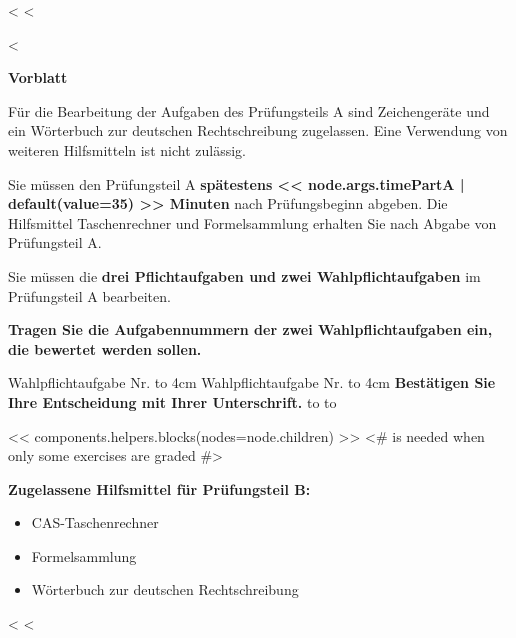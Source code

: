 \documentclass[lang=ngerman]{edoxarticle}
\begin{document}
<%
<%
\begin{exam}<%

\vskip20pt
{\LARGE\textbf{Vorblatt}}
\vskip20pt

Für die Bearbeitung der Aufgaben des Prüfungsteils A sind Zeichengeräte und ein
Wörterbuch zur deutschen Rechtschreibung zugelassen. Eine Verwendung von
weiteren Hilfsmitteln ist nicht zulässig.

Sie müssen den Prüfungsteil A \textbf{spätestens << node.args.timePartA | default(value=35) >> Minuten} nach Prüfungsbeginn
abgeben. Die Hilfsmittel Taschenrechner und Formelsammlung erhalten Sie nach
Abgabe von Prüfungsteil A.

Sie müssen die \textbf{drei Pflichtaufgaben und zwei Wahlpflichtaufgaben} im
Prüfungsteil A bearbeiten.

\textbf{Tragen Sie die Aufgabennummern der zwei Wahlpflichtaufgaben ein, die
bewertet werden sollen.}

\vskip20pt
Wahlpflichtaufgabe Nr. \hbox to 4cm{\hrulefill}
\vskip10pt
Wahlpflichtaufgabe Nr. \hbox to 4cm{\hrulefill}
\vskip30pt
\textbf{Bestätigen Sie Ihre Entscheidung mit Ihrer Unterschrift.}
\vskip10pt
\hbox to \textwidth{Name, Vorname des Prüflings: \kern3.4cm\leaders\hrule\hfill}\vskip10pt
\hbox to \textwidth{Unterschrift des Prüflings:  \kern4cm\leaders\hrule\hfill}

\newpage

<< components.helpers.blocks(nodes=node.children) >>
<# \setpoints is needed when only some exercises are graded #>

\vskip20pt
\textbf{Zugelassene Hilfsmittel für Prüfungsteil B:}
\begin{itemize}
\item CAS-Taschenrechner 
\item Formelsammlung
\item Wörterbuch zur deutschen Rechtschreibung
\end{itemize}


<%
<%
\end{exam}
\end{document}
